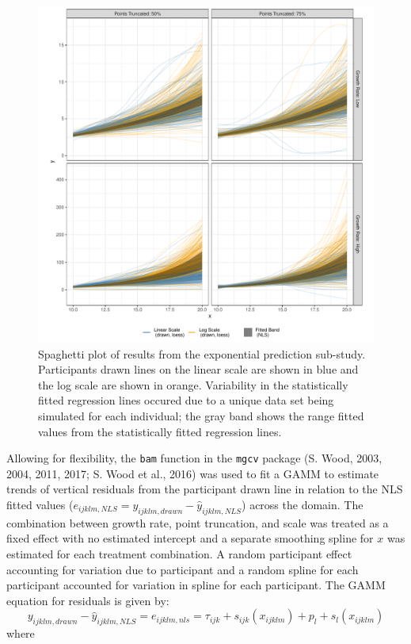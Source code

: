 \documentclass[print]{nuthesis}
\begin{document}
\begin{figure}[tbp]

{\centering \includegraphics[width=1\linewidth,]{thesis_files/figure-latex/exponential-yloess-spaghetti-plot-1} 

}

\caption[Exponential Prediction Spaghetti Plot]{Spaghetti plot of results from the exponential prediction sub-study. Participants drawn lines on the linear scale are shown in blue and the log scale are shown in orange. Variability in the statistically fitted regression lines occured due to a unique data set being simulated for each individual; the gray band shows the range fitted values from the statistically fitted regression lines.}\label{fig:exponential-yloess-spaghetti-plot}
\end{figure}

Allowing for flexibility, the \texttt{bam} function in the \texttt{mgcv} package (S. Wood, 2003, 2004, 2011, 2017; S. Wood et al., 2016) was used to fit a GAMM to estimate trends of vertical residuals from the participant drawn line in relation to the NLS fitted values (\(e_{ijklm,NLS} = y_{ijklm,drawn} - \hat y_{ijklm,NLS}\)) across the domain.
The combination between growth rate, point truncation, and scale was treated as a fixed effect with no estimated intercept and a separate smoothing spline for \(x\) was estimated for each treatment combination.
A random participant effect accounting for variation due to participant and a random spline for each participant accounted for variation in spline for each participant.
The GAMM equation for residuals is given by:
\begin{equation}
y_{ijklm,drawn} - \hat y_{ijklm,NLS} = e_{ijklm,nls} = \tau_{ijk} + s_{ijk}(x_{ijklm}) + p_{l} + s_{l}(x_{ijklm})
\end{equation}
\noindent where
\end{document}
